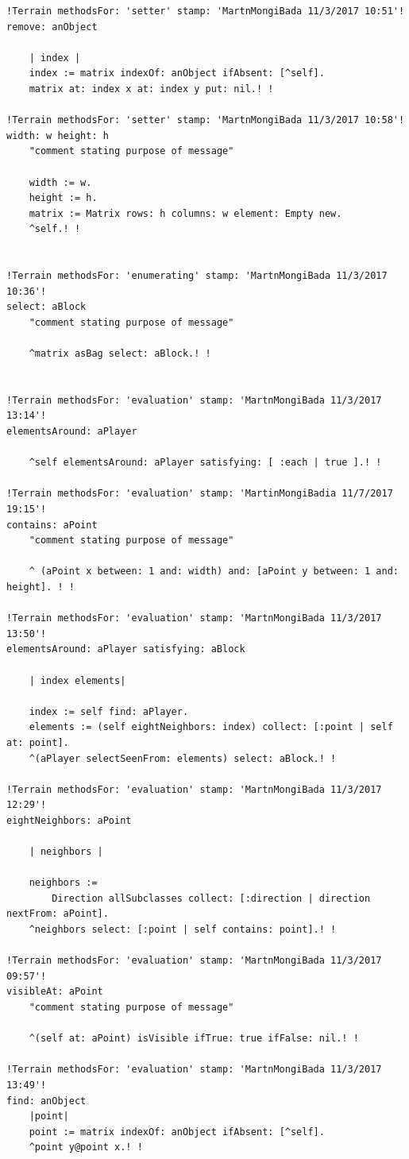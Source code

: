 \documentclass[a4paper]{article}
\begin{document}
\begin{verbatim}
!Terrain methodsFor: 'setter' stamp: 'MartnMongiBada 11/3/2017 10:51'!
remove: anObject

	| index |
	index := matrix indexOf: anObject ifAbsent: [^self].
	matrix at: index x at: index y put: nil.! !

!Terrain methodsFor: 'setter' stamp: 'MartnMongiBada 11/3/2017 10:58'!
width: w height: h
	"comment stating purpose of message"

	width := w.
	height := h.
	matrix := Matrix rows: h columns: w element: Empty new.
	^self.! !


!Terrain methodsFor: 'enumerating' stamp: 'MartnMongiBada 11/3/2017 10:36'!
select: aBlock
	"comment stating purpose of message"

	^matrix asBag select: aBlock.! !


!Terrain methodsFor: 'evaluation' stamp: 'MartnMongiBada 11/3/2017 13:14'!
elementsAround: aPlayer

	^self elementsAround: aPlayer satisfying: [ :each | true ].! !

!Terrain methodsFor: 'evaluation' stamp: 'MartinMongiBadia 11/7/2017 19:15'!
contains: aPoint
	"comment stating purpose of message"

	^ (aPoint x between: 1 and: width) and: [aPoint y between: 1 and: height]. ! !

!Terrain methodsFor: 'evaluation' stamp: 'MartnMongiBada 11/3/2017 13:50'!
elementsAround: aPlayer satisfying: aBlock

	| index elements|

	index := self find: aPlayer.
	elements := (self eightNeighbors: index) collect: [:point | self at: point].
	^(aPlayer selectSeenFrom: elements) select: aBlock.! !

!Terrain methodsFor: 'evaluation' stamp: 'MartnMongiBada 11/3/2017 12:29'!
eightNeighbors: aPoint

	| neighbors |

	neighbors :=
		Direction allSubclasses collect: [:direction | direction nextFrom: aPoint].
	^neighbors select: [:point | self contains: point].! !

!Terrain methodsFor: 'evaluation' stamp: 'MartnMongiBada 11/3/2017 09:57'!
visibleAt: aPoint
	"comment stating purpose of message"

	^(self at: aPoint) isVisible ifTrue: true ifFalse: nil.! !

!Terrain methodsFor: 'evaluation' stamp: 'MartnMongiBada 11/3/2017 13:49'!
find: anObject
	|point|
	point := matrix indexOf: anObject ifAbsent: [^self].
	^point y@point x.! !



\end{verbatim}
\end{document}
